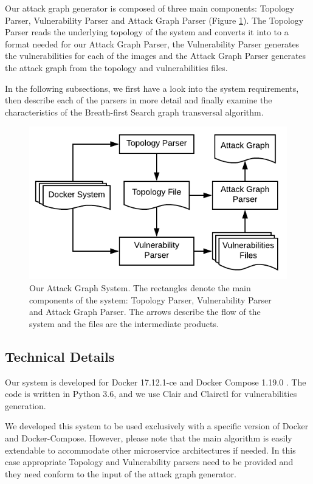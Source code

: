 Our attack graph generator is composed of three main components: Topology Parser, Vulnerability Parser and Attack Graph Parser (Figure \ref{AttackGraphSystem}). The Topology Parser reads the underlying topology of the system and converts it into to a format needed for our Attack Graph Parser, the Vulnerability Parser generates the vulnerabilities for each of the images and the Attack Graph Parser generates the attack graph from the topology and vulnerabilities files. 


In the following subsections, we first have a look into the system requirements, then describe each of the parsers in more detail and finally examine the characteristics of the Breath-first Search graph transversal algorithm.

\begin{figure}
	\includegraphics[scale=0.9]{./images/AttackGraphSystem}
	\caption{Our Attack Graph System. The rectangles denote the main components of the system: Topology Parser, Vulnerability Parser and Attack Graph Parser. The arrows describe the flow of the system and the files are the intermediate products.}
	\label{AttackGraphSystem}
\end{figure}

\subsection{Technical Details}
\label{chap:technical}

Our system is developed for Docker 17.12.1-ce and Docker Compose 1.19.0 \cite{merkel2014docker}. The code is written in Python 3.6, and we use Clair \cite{clair} and Clairctl \cite{clairctl} for vulnerabilities generation.

We developed this system to be used exclusively with a specific version of Docker and Docker-Compose. However, please note that the main algorithm is easily extendable to accommodate other microservice architectures if needed. In this case appropriate Topology and Vulnerability parsers need to be provided and they need conform to the input of the attack graph generator.

